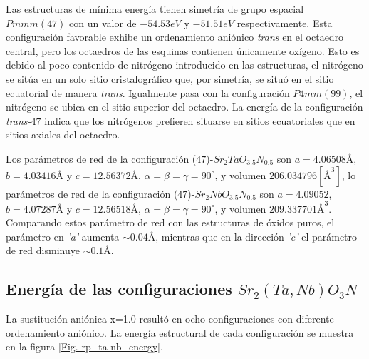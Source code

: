 Las estructuras de mínima energía tienen simetría de grupo espacial $Pmmm(47)$ con un valor de $-54.53 eV$ y $-51.51  eV$ respectivamente. Esta configuración favorable exhibe un ordenamiento aniónico \emph{trans} en el octaedro central, pero los octaedros de las esquinas contienen únicamente oxígeno. Esto es debido al poco contenido de nitrógeno introducido en las estructuras, el nitrógeno se sitúa en un solo sitio cristalográfico que, por simetría, se situó en el sitio ecuatorial de manera \emph{trans}. Igualmente pasa con la configuración $P4mm(99)$, el nitrógeno se ubica en el sitio superior del octaedro. La energía de la configuración \emph{trans-}$47$ indica que los nitrógenos prefieren situarse en sitios ecuatoriales que en sitios axiales del octaedro.

Los parámetros de red de la configuración ($47$)-$Sr_{2}TaO_{3.5}N_{0.5}$ son $a=4.06508 \si{\angstrom}$, $b=4.03416 \si{\angstrom}$ y $c=12.56372 \si{\angstrom}$, $\alpha=\beta=\gamma=90^{\circ}$, y volumen $206.034796 \left[\si{\angstrom}^{3}\right]$,  lo parámetros de red de la configuración ($47$)-$Sr_{2}NbO_{3.5}N_{0.5}$ son $a=4.09052$, $b=4.07287 \si{\angstrom}$ y $c=12.56518 \si{\angstrom}$, $\alpha=\beta=\gamma=90^{\circ}$, y volumen $209.337701  \si{\angstrom}^{3}$. Comparando estos parámetro de red con las estructuras de óxidos puros, el parámetro en \emph{'a'} aumenta $\sim0.04  \si{\angstrom}$, mientras que en la dirección \emph{'c'} el parámetro de red disminuye $\sim0.1 \si{\angstrom}$.

\subsection{Energía de las configuraciones $Sr_{2}(Ta,Nb)O_{3}N$}

La sustitución aniónica x=1.0 resultó en ocho configuraciones con diferente ordenamiento aniónico. La energía estructural de cada configuración se muestra en la figura \ref{Fig. rp_ta-nb_energy}.

